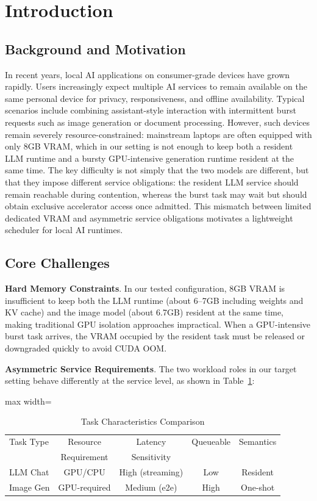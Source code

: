 \section{Introduction}

\subsection{Background and Motivation}

In recent years, local AI applications on consumer-grade devices have grown rapidly. Users increasingly expect multiple AI services to remain available on the same personal device for privacy, responsiveness, and offline availability. Typical scenarios include combining assistant-style interaction with intermittent burst requests such as image generation or document processing. However, such devices remain severely resource-constrained: mainstream laptops are often equipped with only 8GB VRAM, which in our setting is not enough to keep both a resident LLM runtime and a bursty GPU-intensive generation runtime resident at the same time. The key difficulty is not simply that the two models are different, but that they impose different service obligations: the resident LLM service should remain reachable during contention, whereas the burst task may wait but should obtain exclusive accelerator access once admitted. This mismatch between limited dedicated VRAM and asymmetric service obligations motivates a lightweight scheduler for local AI runtimes.

\subsection{Core Challenges}

\textbf{Hard Memory Constraints}. In our tested configuration, 8GB VRAM is insufficient to keep both the LLM runtime (about 6--7GB including weights and KV cache) and the image model (about 6.7GB) resident at the same time, making traditional GPU isolation approaches impractical. When a GPU-intensive burst task arrives, the VRAM occupied by the resident task must be released or downgraded quickly to avoid CUDA OOM.

\textbf{Asymmetric Service Requirements}. The two workload roles in our target setting behave differently at the service level, as shown in Table~\ref{tab:task_characteristics}:

\begin{table}[htbp]
\caption{Task Characteristics Comparison}
\label{tab:task_characteristics}
\centering
\small
\begin{adjustbox}{max width=\columnwidth}
\begin{tabular}{@{}lcccc@{}}
\toprule
Task Type & Resource & Latency & Queueable & Semantics \\
 & Requirement & Sensitivity &  &  \\
\midrule
LLM Chat & GPU/CPU & High (streaming) & Low & Resident \\
Image Gen & GPU-required & Medium (e2e) & High & One-shot \\
\bottomrule
\end{tabular}
\end{adjustbox}
\end{table}

